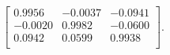 \begin{equation*}
\begin{bmatrix}
  0.9956 &  -0.0037 &  -0.0941 \\
 -0.0020 &   0.9982 &  -0.0600 \\
  0.0942 &   0.0599 &   0.9938 \\
\end{bmatrix}.
\end{equation*}
